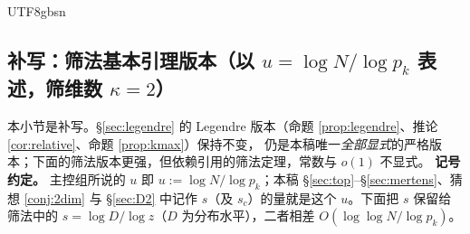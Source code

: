\documentclass[11pt,a4paper]{article}
\theoremstyle{plain}
\theoremstyle{definition}
\begin{document}
\begin{CJK}{UTF8}{gbsn}
\subsection*{补写：筛法基本引理版本（以 $u=\log N/\log p_k$ 表述，筛维数 $\kappa=2$）}
\label{subsec:sieveu}

本小节是补写。\S\ref{sec:legendre} 的 Legendre 版本（命题 \ref{prop:legendre}、推论 \ref{cor:relative}、命题 \ref{prop:kmax}）保持不变，
仍是本稿唯一\emph{全部显式}的严格版本；下面的筛法版本更强，但依赖引用的筛法定理，常数与 $o(1)$ 不显式。
\textbf{记号约定。} 主控组所说的 $u$ 即 $u:=\log N/\log p_k$；本稿 \S\ref{sec:top}--\S\ref{sec:mertens}、猜想 \ref{conj:2dim}
与 \S\ref{sec:D2} 中记作 $s$（及 $s_c$）的量就是这个 $u$。下面把 $s$ 保留给筛法中的 $s=\log D/\log z$（$D$ 为分布水平），二者相差
$O(\log\log N/\log p_k)$。


\end{CJK}
\end{document}
